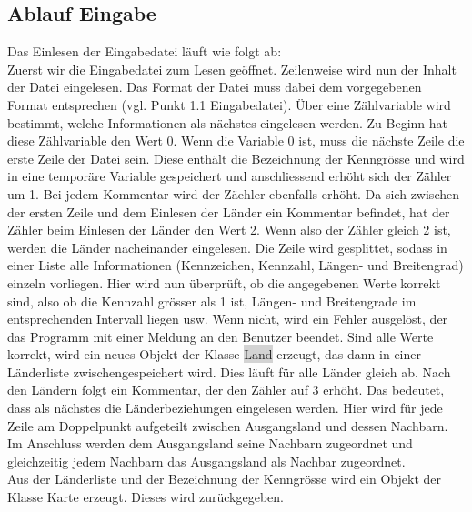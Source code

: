 \documentclass[a4paper,11pt]{article}
\begin{document}
{\subsection{Ablauf Eingabe}
Das Einlesen der Eingabedatei l\"auft wie folgt ab:\\
Zuerst wir die Eingabedatei zum Lesen ge\"offnet. Zeilenweise wird nun der Inhalt der Datei eingelesen. Das Format der Datei muss dabei dem vorgegebenen Format entsprechen (vgl. Punkt 1.1 Eingabedatei).
\"Uber eine Z\"ahlvariable wird bestimmt, welche Informationen als n\"achstes eingelesen werden. Zu Beginn hat diese Z\"ahlvariable den Wert 0.
Wenn die Variable 0 ist, muss die n\"achste Zeile die erste Zeile der Datei sein. Diese enth\"alt die Bezeichnung der Kenngr\"osse und wird in eine tempor\"are Variable gespeichert und anschliessend erh\"oht sich der Z\"ahler um 1.
Bei jedem Kommentar wird der Z\"aehler ebenfalls erh\"oht. Da sich zwischen der ersten Zeile und dem Einlesen der L\"ander ein Kommentar befindet, hat der Z\"ahler beim Einlesen der L\"ander den Wert 2.
Wenn also der Z\"ahler gleich 2 ist, werden die L\"ander nacheinander eingelesen. Die Zeile wird gesplittet, sodass in einer Liste alle Informationen (Kennzeichen, Kennzahl, L\"angen- und Breitengrad) einzeln vorliegen.
Hier wird nun \"uberpr\"uft, ob die angegebenen Werte korrekt sind, also ob die Kennzahl gr\"osser als 1 ist, L\"angen- und Breitengrade im entsprechenden Intervall liegen usw. 
Wenn nicht, wird ein Fehler ausgel\"ost, der das Programm mit einer Meldung an den Benutzer beendet. Sind alle Werte korrekt, wird ein neues Objekt der Klasse \colorbox{lightgray}{Land} erzeugt, das dann in
einer L\"anderliste zwischengespeichert wird. Dies l\"auft f\"ur alle L\"ander gleich ab.
Nach den L\"andern folgt ein Kommentar, der den Z\"ahler auf 3 erh\"oht. Das bedeutet, dass als n\"achstes die L\"anderbeziehungen eingelesen werden.
Hier wird f\"ur jede Zeile am Doppelpunkt aufgeteilt zwischen Ausgangsland und dessen Nachbarn. Im Anschluss werden dem Ausgangsland seine Nachbarn zugeordnet und
gleichzeitig jedem Nachbarn das Ausgangsland als Nachbar zugeordnet.\\
Aus der L\"anderliste und der Bezeichnung der Kenngr\"osse wird ein Objekt der Klasse Karte erzeugt. Dieses wird zur\"uckgegeben.

}
\end{document}
